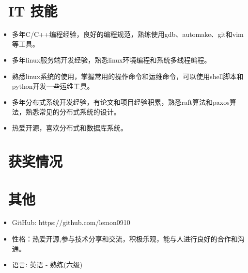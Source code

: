 \documentclass{resume}
\begin{document}

\section{\faCogs\ IT 技能}
\begin{itemize}[parsep=0.5ex]
  \item 多年C/C++编程经验，良好的编程规范，熟练使用gdb、automake、git和vim等工具。
  \item 多年linux服务端开发经验，熟悉linux环境编程和系统多线程编程。
  \item 熟悉linux系统的使用，掌握常用的操作命令和运维命令，可以使用shell脚本和python开发一些运维工具。
  \item 多年分布式系统开发经验，有论文和项目经验积累，熟悉raft算法和paxos算法，熟悉常见的分布式系统的设计。
  \item 热爱开源，喜欢分布式和数据库系统。
\end{itemize}

\section{\faHeartO\ 获奖情况}

\section{\faInfo\ 其他}
\begin{itemize}[parsep=0.5ex]
  \item GitHub: https://github.com/lemon0910
  \item 性格：热爱开源,参与技术分享和交流，积极乐观，能与人进行良好的合作和沟通。
  \item 语言: 英语 - 熟练(六级)
\end{itemize}

%
%
\end{document}
